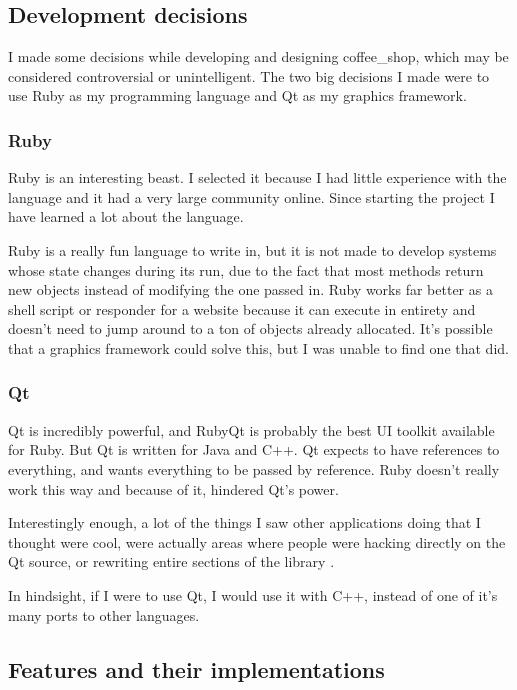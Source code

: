 \documentclass[10pt]{article}
\begin{document}
\subsection{Development decisions}

I made some decisions while developing and designing coffee\_shop, which may be considered controversial or unintelligent. The two big decisions I made were to use Ruby as my programming language and Qt as my graphics framework.

\subsubsection{Ruby}

Ruby is an interesting beast. I selected it because I had little experience with the language and it had a very large community online. Since starting the project I have learned a lot about the language.

Ruby is a really fun language to write in, but it is not made to develop systems whose state changes during its run, due to the fact that most methods return new objects instead of modifying the one passed in. Ruby works far better as a shell script or responder for a website because it can execute in entirety and doesn't need to jump around to a ton of objects already allocated. It's possible that a graphics framework could solve this, but I was unable to find one that did.

\subsubsection{Qt}

Qt is incredibly powerful, and RubyQt \cite{rubyqt} is probably the best UI toolkit available for Ruby. But Qt is written for Java and C++. Qt expects to have references to everything, and wants everything to be passed by reference. Ruby doesn't really work this way and because of it, hindered Qt's power.

Interestingly enough, a lot of the things I saw other applications doing that I thought were cool, were actually areas where people were hacking directly on the Qt source, or rewriting entire sections of the library \cite{kwrite}.

In hindsight, if I were to use Qt, I would use it with C++, instead of one of it's many ports to other languages.

\subsection{Features and their implementations}
\end{document}
